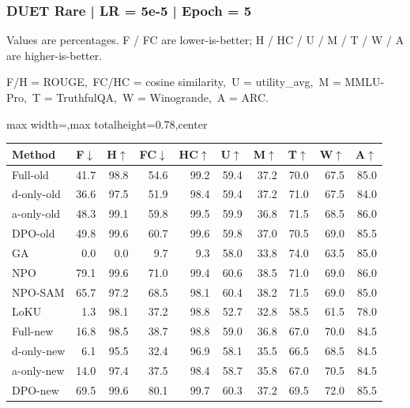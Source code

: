\documentclass[aspectratio=169,11pt]{beamer}
\begin{document}
\begin{frame}[t]
\frametitle{DUET Rare | LR = 5e-5 | Epoch = 5}
{\tiny Values are percentages. F / FC are lower-is-better; H / HC / U / M / T / W / A are higher-is-better.}

{\tiny F/H = ROUGE,\ FC/HC = cosine similarity,\ U = utility\_avg,\ M = MMLU-Pro,\ T = TruthfulQA,\ W = Winogrande,\ A = ARC.}

\vspace{0.35em}
\centering
\scriptsize
\setlength{\tabcolsep}{3.6pt}
\renewcommand{\arraystretch}{1.05}
\begin{adjustbox}{max width=\textwidth,max totalheight=0.78\textheight,center}
\begin{tabular}{l*{9}{r}}
\toprule
Method & F$\downarrow$ & H$\uparrow$ & FC$\downarrow$ & HC$\uparrow$ & U$\uparrow$ & M$\uparrow$ & T$\uparrow$ & W$\uparrow$ & A$\uparrow$ \\
\midrule
\rowcolor{blue!10}
Full-old & 41.7 & 98.8 & 54.6 & 99.2 & 59.4 & 37.2 & 70.0 & 67.5 & 85.0 \\
\rowcolor{orange!10}
d-only-old & 36.6 & 97.5 & 51.9 & 98.4 & 59.4 & 37.2 & 71.0 & 67.5 & 84.0 \\
\rowcolor{green!10}
a-only-old & 48.3 & 99.1 & 59.8 & 99.5 & 59.9 & 36.8 & 71.5 & 68.5 & 86.0 \\
\rowcolor{gray!8}
DPO-old & 49.8 & 99.6 & 60.7 & 99.6 & 59.8 & 37.0 & 70.5 & 69.0 & 85.5 \\
\rowcolor{gray!8}
GA & 0.0 & 0.0 & 9.7 & 9.3 & 58.0 & 33.8 & 74.0 & 63.5 & 85.0 \\
\rowcolor{gray!8}
NPO & 79.1 & 99.6 & 71.0 & 99.4 & 60.6 & 38.5 & 71.0 & 69.0 & 86.0 \\
\rowcolor{gray!8}
NPO-SAM & 65.7 & 97.2 & 68.5 & 98.1 & 60.4 & 38.2 & 71.5 & 69.0 & 85.0 \\
\rowcolor{gray!8}
LoKU & 1.3 & 98.1 & 37.2 & 98.8 & 52.7 & 32.8 & 58.5 & 61.5 & 78.0 \\
\rowcolor{blue!20}
Full-new & 16.8 & 98.5 & 38.7 & 98.8 & 59.0 & 36.8 & 67.0 & 70.0 & 84.5 \\
\rowcolor{orange!20}
d-only-new & 6.1 & 95.5 & 32.4 & 96.9 & 58.1 & 35.5 & 66.5 & 68.5 & 84.5 \\
\rowcolor{green!20}
a-only-new & 14.0 & 97.4 & 37.5 & 98.4 & 58.7 & 35.8 & 67.0 & 70.5 & 84.5 \\
\rowcolor{gray!15}
DPO-new & 69.5 & 99.6 & 80.1 & 99.7 & 60.3 & 37.2 & 69.5 & 72.0 & 85.5 \\
\bottomrule
\end{tabular}
\end{adjustbox}
\end{frame}
\end{document}

